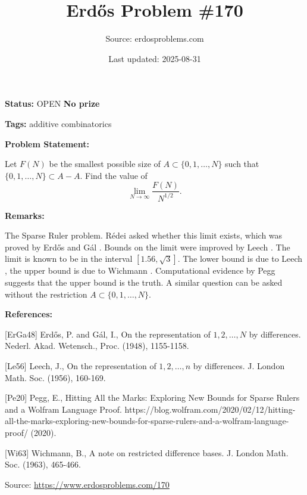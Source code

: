 \documentclass{article}
\title{Erd\H{o}s Problem \#170}
\date{Last updated: 2025-08-31}
\author{Source: erdosproblems.com}
\begin{document}
\maketitle

\noindent\textbf{Status:} OPEN \quad \textbf{No prize}

\noindent\textbf{Tags:} additive combinatorics

\medskip
\noindent\textbf{Problem Statement:}

Let $F(N)$ be the smallest possible size of $A\subset \{0,1,\ldots,N\}$ such that $\{0,1,\ldots,N\}\subset A-A$. Find the value of\[\lim_{N\to \infty}\frac{F(N)}{N^{1/2}}.\]

\bigskip
\noindent\textbf{Remarks:}

The Sparse Ruler problem. R\'{e}dei asked whether this limit exists, which was proved by Erd\H{o}s and G\'{a}l \cite{ErGa48}. Bounds on the limit were improved by Leech \cite{Le56}. The limit is known to be in the interval $[1.56,\sqrt{3}]$. The lower bound is due to Leech \cite{Le56}, the upper bound is due to Wichmann \cite{Wi63}. Computational evidence by Pegg \cite{Pe20} suggests that the upper bound is the truth. A similar question can be asked without the restriction $A\subset \{0,1,\ldots,N\}$.

\bigskip
\noindent\textbf{References:}

[ErGa48] Erd\H{o}s, P. and G\'{a}l, I., On the representation of $1,2,\ldots,N$ by differences. Nederl. Akad. Wetensch., Proc. (1948), 1155-1158.
 
 [Le56] Leech, J., On the representation of $1,2,\ldots,n$ by differences. J. London Math. Soc. (1956), 160-169.
 
 [Pe20] Pegg, E., Hitting All the Marks: Exploring New Bounds for Sparse Rulers and a Wolfram Language Proof. https://blog.wolfram.com/2020/02/12/hitting-all-the-marks-exploring-new-bounds-for-sparse-rulers-and-a-wolfram-language-proof/ (2020).
 
 [Wi63] Wichmann, B., A note on restricted difference bases. J. London Math. Soc. (1963), 465-466.

\bigskip
\noindent\small{Source: \url{https://www.erdosproblems.com/170}}
\end{document}
